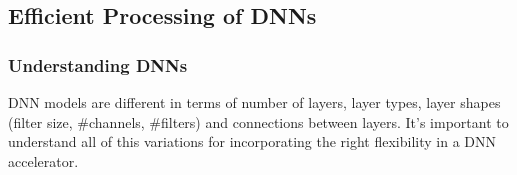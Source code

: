 
\subsection{Efficient Processing of DNNs}
\label{subsec:efficient-processing-dnns}

\subsubsection{Understanding DNNs}
DNN models are different in terms of number of layers, layer types, layer shapes (filter size, \#channels, \#filters) and connections between layers. It's important to understand all of this variations for incorporating the right flexibility in a DNN accelerator.
